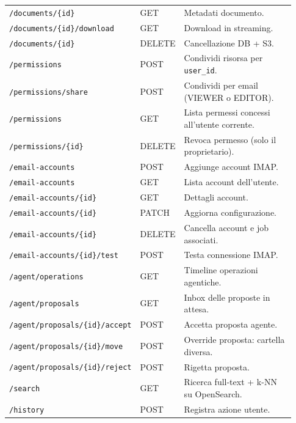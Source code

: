 \begin{longtable}{p{0.32\linewidth} p{0.14\linewidth} p{0.47\linewidth}}
\texttt{/documents/\{id\}}                    & GET    & Metadati documento. \\
\texttt{/documents/\{id\}/download}           & GET    & Download in streaming. \\
\texttt{/documents/\{id\}}                    & DELETE & Cancellazione DB + S3. \\
\midrule
\texttt{/permissions}                         & POST   & Condividi risorsa per \texttt{user\_id}. \\
\texttt{/permissions/share}                   & POST   & Condividi per email (VIEWER o EDITOR). \\
\texttt{/permissions}                         & GET    & Lista permessi concessi all'utente corrente. \\
\texttt{/permissions/\{id\}}                  & DELETE & Revoca permesso (solo il proprietario). \\
\midrule
\texttt{/email-accounts}                      & POST   & Aggiunge account IMAP. \\
\texttt{/email-accounts}                      & GET    & Lista account dell'utente. \\
\texttt{/email-accounts/\{id\}}               & GET    & Dettagli account. \\
\texttt{/email-accounts/\{id\}}               & PATCH  & Aggiorna configurazione. \\
\texttt{/email-accounts/\{id\}}               & DELETE & Cancella account e job associati. \\
\texttt{/email-accounts/\{id\}/test}          & POST   & Testa connessione IMAP. \\
\midrule
\texttt{/agent/operations}                    & GET    & Timeline operazioni agentiche. \\
\texttt{/agent/proposals}                     & GET    & Inbox delle proposte in attesa. \\
\texttt{/agent/proposals/\{id\}/accept}       & POST   & Accetta proposta agente. \\
\texttt{/agent/proposals/\{id\}/move}         & POST   & Override proposta: cartella diversa. \\
\texttt{/agent/proposals/\{id\}/reject}       & POST   & Rigetta proposta. \\
\midrule
\texttt{/search}                              & GET    & Ricerca full-text + k-NN su OpenSearch. \\
\midrule
\texttt{/history}                             & POST   & Registra azione utente. \\

\end{longtable}
